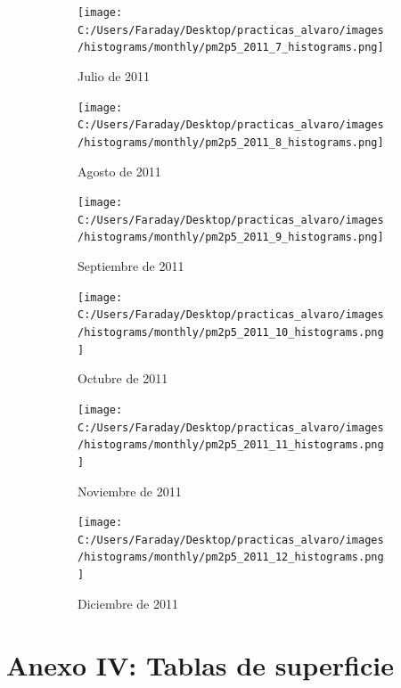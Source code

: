 \documentclass[12pt]{article}
\begin{document}
\newpage

\begin{figure}[H]
\centering
\begin{subfigure}[h]{0.45\textwidth}
\texttt{[image: C:/Users/Faraday/Desktop/practicas\_alvaro/images/histograms/monthly/pm2p5\_2011\_7\_histograms.png]}
\caption{Julio de 2011}
\label{fig:hist-mon-4-7-2011}
\end{subfigure}
%
\begin{subfigure}[H]{0.45\textwidth}
\texttt{[image: C:/Users/Faraday/Desktop/practicas\_alvaro/images/histograms/monthly/pm2p5\_2011\_8\_histograms.png]}
\caption{Agosto de 2011}
\label{fig:hist-mon-4-8-2011}
\end{subfigure}
\caption{}
\end{figure}

\begin{figure}[H]
\centering
\begin{subfigure}[h]{0.45\textwidth}
\texttt{[image: C:/Users/Faraday/Desktop/practicas\_alvaro/images/histograms/monthly/pm2p5\_2011\_9\_histograms.png]}
\caption{Septiembre de 2011}
\label{fig:hist-mon-4-9-2011}
\end{subfigure}
%
\begin{subfigure}[H]{0.45\textwidth}
\texttt{[image: C:/Users/Faraday/Desktop/practicas\_alvaro/images/histograms/monthly/pm2p5\_2011\_10\_histograms.png]}
\caption{Octubre de 2011}
\label{fig:hist-mon-4-10-2011}
\end{subfigure}
\caption{}
\end{figure}

\begin{figure}[H]
\centering
\begin{subfigure}[h]{0.45\textwidth}
\texttt{[image: C:/Users/Faraday/Desktop/practicas\_alvaro/images/histograms/monthly/pm2p5\_2011\_11\_histograms.png]}
\caption{Noviembre de 2011}
\label{fig:hist-mon-4-11-2011}
\end{subfigure}
%
\begin{subfigure}[H]{0.45\textwidth}
\texttt{[image: C:/Users/Faraday/Desktop/practicas\_alvaro/images/histograms/monthly/pm2p5\_2011\_12\_histograms.png]}
\caption{Diciembre de 2011}
\label{fig:hist-mon-4-12-2011}
\end{subfigure}
\caption{}
\end{figure}

\newpage

\section*{Anexo IV: Tablas de superficie}
%
\end{document}
